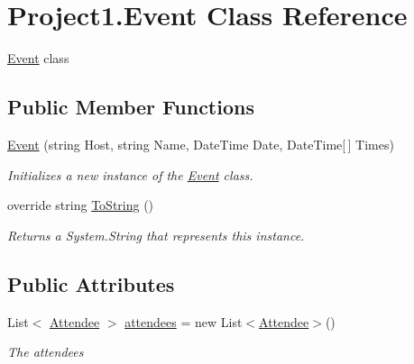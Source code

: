 \hypertarget{classProject1_1_1Event}{}\section{Project1.\+Event Class Reference}
\label{classProject1_1_1Event}


\hyperlink{classProject1_1_1Event}{Event} class  


\subsection*{Public Member Functions}
\begin{DoxyCompactItemize}
\item 
\hyperlink{classProject1_1_1Event_a55c477aa9e921902fd85ff505c93b661}{Event} (string Host, string Name, Date\+Time Date, Date\+Time\mbox{[}$\,$\mbox{]} Times)
\begin{DoxyCompactList}\small\item\em Initializes a new instance of the \hyperlink{classProject1_1_1Event}{Event} class. \end{DoxyCompactList}\item 
override string \hyperlink{classProject1_1_1Event_a0e234eb98d62ce49bd5ed4c658e307ff}{To\+String} ()
\begin{DoxyCompactList}\small\item\em Returns a System.\+String that represents this instance. \end{DoxyCompactList}\end{DoxyCompactItemize}
\subsection*{Public Attributes}
\begin{DoxyCompactItemize}
\item 
List$<$ \hyperlink{classProject1_1_1Attendee}{Attendee} $>$ \hyperlink{classProject1_1_1Event_ab84e6fa3b0d021689d80c02e4d23731b}{attendees} = new List$<$\hyperlink{classProject1_1_1Attendee}{Attendee}$>$()
\begin{DoxyCompactList}\small\item\em The attendees \end{DoxyCompactList}\end{DoxyCompactItemize}
